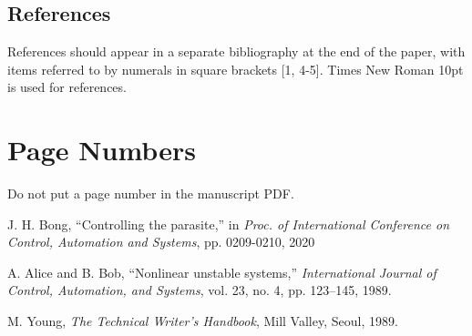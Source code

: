 \documentclass[10pt,twocolumn]{ICCAS}
\begin{document}
\subsection{References} References should appear in a separate
bibliography at the end of the paper, with items referred to by
numerals in square brackets [1, 4-5]. Times New Roman 10pt is used
for references.

\section{Page Numbers}
Do not put a page number in the manuscript PDF.



%


%
\begin{thebibliography}{99}

J. H. Bong, ``Controlling the parasite,'' in \textit{Proc. of International Conference on Control, Automation and Systems}, pp. 0209-0210, 2020


A. Alice and B. Bob, ``Nonlinear unstable systems,'' \textit{International Journal of Control, Automation, and Systems}, vol. 23, no. 4, pp. 123–145, 1989.

M. Young, \textit{The Technical Writer's Handbook}, Mill Valley, Seoul, 1989.



\end{thebibliography}
%
\end{document}
